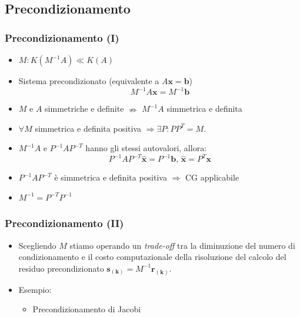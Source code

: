 \documentclass[10pt]{beamer}
\begin{document}
\subsection{Precondizionamento}
\begin{frame}
\frametitle{Precondizionamento (I)}
\begin{itemize}
    
    \item $M: K(M^{-1}A)\ll K(A)$
    \item \alert{Sistema precondizionato} (equivalente a $A\mathbf{x}=\mathbf{b}$)
    $$
    M^{-1}A\mathbf{x}=M^{-1}\mathbf{b}
    $$
    \item $M$ e $A$ simmetriche e definite $\nRightarrow$ $M^{-1}A$ simmetrica e definita
    \item $\forall M$ simmetrica e definita positiva $\Rightarrow \exists P : PP^T=M$.
    \item $M^{-1}A$ e $P^{-1}AP^{-T}$ hanno gli stessi autovalori, allora:
    $$
    P^{-1}AP^{-T}\mathbf{\hat{x}}=P^{-1}\mathbf{b},\, \mathbf{\hat{x}}=P^T\mathbf{x}
    $$
    
    \item $P^{-1}AP^{-T}$ è simmetrica e definita positiva $\Rightarrow$ CG applicabile
    \item $M^{-1}=P^{-T}P^{-1}$
    
\end{itemize}    
\end{frame}


\begin{frame}
\frametitle{Precondizionamento (II)}
\begin{itemize}
    \item Scegliendo $M$ stiamo operando un \textit{trade-off} tra la diminuzione del numero di condizionamento e il costo computazionale della risoluzione del calcolo del residuo precondizionato $\mathbf{s_{(k)}}=M^{-1}\mathbf{r_{(k)}}$.
    \item Esempio:
    \begin{itemize}
    \item Precondizionamento di Jacobi
    \end{itemize}    
   
\end{itemize}    
\end{frame}
\end{document}
